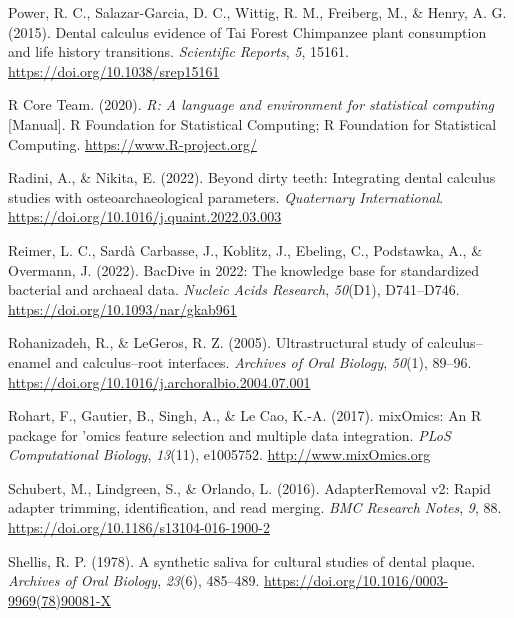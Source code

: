 \documentclass[
  letterpaper,
]{book}
\newlength{\cslhangindent}
\newlength{\cslentryspacingunit} %
\newenvironment{CSLReferences}[2] %
 {%
  \setlength{\parindent}{0pt}
  \ifodd #1
  \let\oldpar\par
  \def\par{\hangindent=\cslhangindent\oldpar}
  \fi
  \setlength{\parskip}{#2\cslentryspacingunit}
 }%
 {}
\begin{document}
\begin{CSLReferences}{1}{0}
\leavevmode{}%
Power, R. C., Salazar-Garcia, D. C., Wittig, R. M., Freiberg, M., \&
Henry, A. G. (2015). Dental calculus evidence of {Tai Forest Chimpanzee}
plant consumption and life history transitions. \emph{Scientific
Reports}, \emph{5}, 15161. \url{https://doi.org/10.1038/srep15161}

\leavevmode{}%
R Core Team. (2020). \emph{R: {A} language and environment for
statistical computing} {[}Manual{]}. {R Foundation for Statistical
Computing}; {R Foundation for Statistical Computing}.
\url{https://www.R-project.org/}

\leavevmode{}%
Radini, A., \& Nikita, E. (2022). Beyond dirty teeth: {Integrating}
dental calculus studies with osteoarchaeological parameters.
\emph{Quaternary International}.
\url{https://doi.org/10.1016/j.quaint.2022.03.003}

\leavevmode{}%
Reimer, L. C., Sardà Carbasse, J., Koblitz, J., Ebeling, C., Podstawka,
A., \& Overmann, J. (2022). {BacDive} in 2022: The knowledge base for
standardized bacterial and archaeal data. \emph{Nucleic Acids Research},
\emph{50}(D1), D741--D746. \url{https://doi.org/10.1093/nar/gkab961}

\leavevmode{}%
Rohanizadeh, R., \& LeGeros, R. Z. (2005). Ultrastructural study of
calculus--enamel and calculus--root interfaces. \emph{Archives of Oral
Biology}, \emph{50}(1), 89--96.
\url{https://doi.org/10.1016/j.archoralbio.2004.07.001}

\leavevmode{}%
Rohart, F., Gautier, B., Singh, A., \& Le Cao, K.-A. (2017). {mixOmics}:
{An R} package for 'omics feature selection and multiple data
integration. \emph{PLoS Computational Biology}, \emph{13}(11), e1005752.
\url{http://www.mixOmics.org}

\leavevmode{}%
Schubert, M., Lindgreen, S., \& Orlando, L. (2016). {AdapterRemoval} v2:
Rapid adapter trimming, identification, and read merging. \emph{BMC
Research Notes}, \emph{9}, 88.
\url{https://doi.org/10.1186/s13104-016-1900-2}

\leavevmode{}%
Shellis, R. P. (1978). A synthetic saliva for cultural studies of dental
plaque. \emph{Archives of Oral Biology}, \emph{23}(6), 485--489.
\url{https://doi.org/10.1016/0003-9969(78)90081-X}


\end{CSLReferences}
\end{document}
